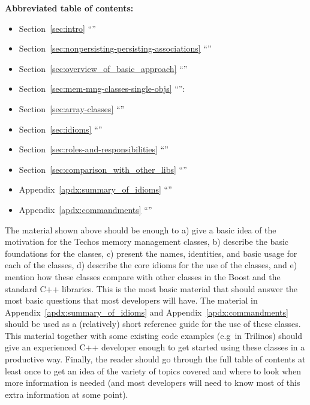 \documentclass[pdf,ps2pdf,11pt]{SANDreport}
\begin{document}
{}\noindent\textbf{Abbreviated table of contents:}

\begin{itemize}

{}\item Section~\ref{sec:intro} ``''

{}\item Section~\ref{sec:nonpersisting-persisting-associations}
``''

{}\item Section~\ref{sec:overview_of_basic_approach}
``''

{}\item Section~\ref{sec:mem-mng-classes-single-objs}
``{}'':\\[2ex]

{}\item Section~\ref{sec:array-classes}
``{}''

{}\item Section~\ref{sec:idioms} ``{}''

{}\item Section~\ref{sec:roles-and-responsibilities}
``''

{}\item Section~\ref{sec:comparison_with_other_libs}
``{}''

{}\item Appendix~\ref{apdx:summary_of_idioms}
``{}''

{}\item Appendix~\ref{apdx:commandments}
``{}''

\end{itemize}

The material shown above should be enough to a) give a basic idea of
the motivation for the Techos memory management classes, b) describe
the basic foundations for the classes, c) present the names,
identities, and basic usage for each of the classes, d) describe the
core idioms for the use of the classes, and e) mention how these
classes compare with other classes in the Boost and the standard C++
libraries.  This is the most basic material that should answer the
most basic questions that most developers will have.  The material in
Appendix~\ref{apdx:summary_of_idioms} and
Appendix~\ref{apdx:commandments} should be used as a (relatively)
short reference guide for the use of these classes.  This material
together with some existing code examples (e.g\ in Trilinos) should
give an experienced C++ developer enough to get started using these
classes in a productive way.  Finally, the reader should go through
the full table of contents at least once to get an idea of the variety
of topics covered and where to look when more information is needed
(and most developers will need to know most of this extra information
at some point).
\end{document}
